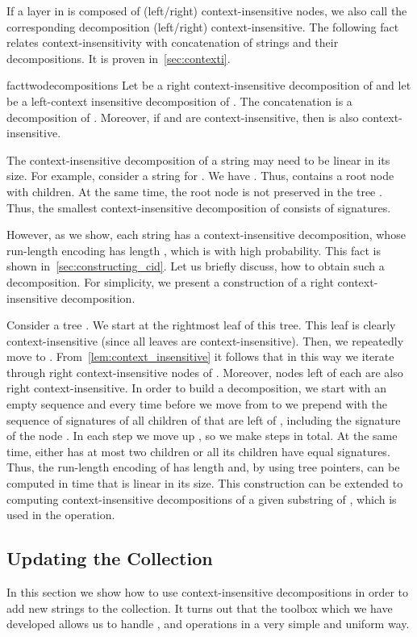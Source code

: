 \documentclass[a4paper]{article}
\theoremstyle{remark}
\begin{document}
If a layer in  is composed of (left/right) context-insensitive nodes,
we also call the corresponding decomposition (left/right) context-insensitive.
The following fact relates context-insensitivity with concatenation of strings and their decompositions.
It is proven in~\cref{sec:contexti}.

\begin{restatable}{fact}{twodecompositions}\label{fact:two-decompositions}
Let  be a right context-insensitive decomposition of  and let  be a left-context insensitive decomposition of .
The concatenation  is a decomposition of . Moreover, if  and  are context-insensitive, then 
is also context-insensitive.
\end{restatable}

The context-insensitive decomposition of a string may need to be linear in its size.
For example, consider a string  for .
We have .
Thus,  contains a root node with  children.
At the same time, the root node is not preserved in the tree .
Thus, the smallest context-insensitive decomposition of  consists of  signatures.

However, as we show, each string  has a context-insensitive decomposition, whose run-length encoding has length , which is  with high probability.
This fact is shown in~\cref{sec:constructing_cid}.
Let us briefly discuss, how to obtain such a decomposition.
For simplicity, we present a construction of a right context-insensitive decomposition.

Consider a tree .
We start at the rightmost leaf  of this tree.
This leaf is clearly context-insensitive (since all leaves are context-insensitive).
Then, we repeatedly move to .
From~\cref{lem:context_insensitive} it follows that in this way we iterate through right context-insensitive nodes of .
Moreover, nodes left of each  are also right context-insensitive.
In order to build a decomposition, we start with an empty sequence  and every time before we move from  to  we prepend  with the sequence of signatures of all children of  that are left of , including the signature of the node .
In each step we move up , so we make  steps in total.
At the same time,  either has at most two children or all its children have equal signatures.
Thus, the run-length encoding of  has length  and, by using tree pointers, can be computed in time that is linear in its size.
This construction can be extended to computing context-insensitive decompositions of a given substring of , which is used in the  operation.

\subsection{Updating the Collection}
In this section we show how to use context-insensitive decompositions in order to add new strings to the collection.
It turns out that the toolbox which we have developed allows us to handle ,  and  operations in a very simple and uniform way.
\end{document}
